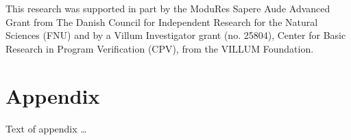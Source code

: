 \documentclass[sigplan,review]{acmart}\settopmatter{printfolios=true,printccs=false,printacmref=false}
\begin{document}
\begin{acks}                            %

  This research was supported in part by the ModuRes Sapere Aude Advanced Grant from The Danish Council for Independent Research for the Natural Sciences (FNU) and by a Villum Investigator grant (no.
  25804), Center for Basic Research in Program Verification (CPV), from the VILLUM Foundation.
  
\end{acks}





\appendix
\section{Appendix}

Text of appendix \ldots
\end{document}
